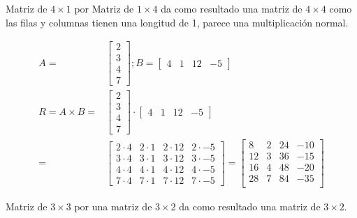 Matriz de $ 4\times1 $ por Matriz de $1\times4 $ da como resultado una matriz de
$4\times4$ como las filas y columnas tienen una longitud de 1, parece una
multiplicación normal.

\begin{align*}
    A =
    &\begin{bmatrix}
        2 \\
        3\\
        4\\
        7
    \end{bmatrix}
    ; B =
    \begin{bmatrix}
        4 & 1 & 12 & -5
    \end{bmatrix}\\
    R = A\times B =
    &\begin{bmatrix}
        2 \\
        3\\
        4\\
        7
    \end{bmatrix}
    \cdot
    \begin{bmatrix}
        4 & 1 & 12 & -5
    \end{bmatrix}\\
    =
    &\begin{bmatrix}
        2\cdot4 & 2\cdot 1 & 2\cdot 12 & 2\cdot -5\\
        3\cdot4 & 3\cdot 1 & 3\cdot 12 & 3\cdot -5\\
        4\cdot4 & 4\cdot 1 & 4\cdot 12 & 4\cdot -5\\
        7\cdot4 & 7\cdot 1 & 7\cdot 12 & 7\cdot -5
    \end{bmatrix}
    =
    \begin{bmatrix}
        8  & 2 & 24 & -10\\
        12 & 3 & 36 & -15\\
        16 & 4 & 48 & -20\\
        28 & 7 & 84 & -35\\
    \end{bmatrix}
\end{align*}

Matriz de $3\times3$ por una matriz de $3 \times 2$ da como resultado una
matriz de $3 \times 2$.

